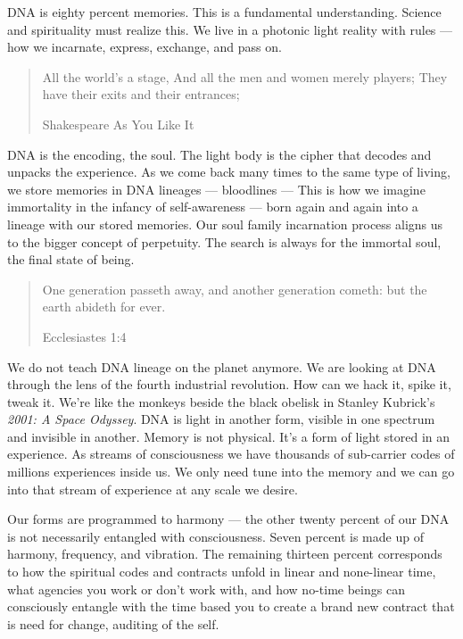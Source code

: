 \documentclass[letterpaper,9pt,twoside,titlepage,onecolumn,openany]{book}
\begin{document}
DNA is eighty percent memories. This is a fundamental understanding.
Science and spirituality must realize this. We live in a photonic light
reality with rules --- how we incarnate, express, exchange, and pass on.

\begin{quote}
All the world's a stage,
And all the men and women merely players;
They have their exits and their entrances;

Shakespeare  As You Like It
\end{quote}

DNA is the encoding, the soul. The light body is the cipher that decodes
and unpacks the experience. As we come back many times to the same type
of living, we store memories in DNA lineages --- bloodlines --- This is
how we imagine immortality in the infancy of self-awareness --- born
again and again into a lineage with our stored memories. Our soul family
incarnation process aligns us to the bigger concept of perpetuity. The
search is always for the immortal soul, the final state of being.

\begin{quote}
One generation passeth away, and another generation cometh: but the earth abideth for ever.

Ecclesiastes 1:4
\end{quote}

We do not teach DNA lineage on the planet anymore. We are looking at DNA
through the lens of the fourth industrial revolution. How can we hack
it, spike it, tweak it. We're like the monkeys beside the black obelisk
in Stanley Kubrick's \emph{2001: A Space Odyssey}. DNA is light in
another form, visible in one spectrum and invisible in another. Memory
is not physical. It's a form of light stored in an experience. ​​​​​​​As
streams of consciousness we have thousands of sub-carrier codes of
millions experiences inside us. We only need tune into the memory and we
can go into that stream of experience at any scale we desire.

Our forms are programmed to harmony --- the other twenty percent of our
DNA is not necessarily entangled with consciousness. Seven percent is
made up of harmony, frequency, and vibration. The remaining thirteen
percent corresponds to how the spiritual codes and contracts unfold in
linear and none-linear time, what agencies you work or don't work with,
and how no-time beings can consciously entangle with the time based you
to create a brand new contract that is need for change, auditing of the
self.
\end{document}
